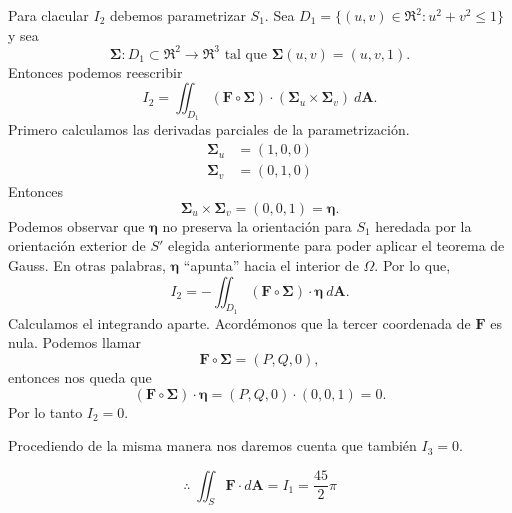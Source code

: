 \begin{solution}
    Para clacular $I_2$  debemos parametrizar $S_1$.  Sea  $D_1=\{(u,v)\in\Re^2:u^2+v^2\leq1\}$ y  sea  $$\boldsymbol{\Sigma}:D_1\subset\Re^2\to\Re^3  \mbox{ tal que }   \boldsymbol{\Sigma}(u,v)=(u,v,1).$$ 
    Entonces podemos reescribir
    \[
    I_2=\iint _{D_1} (\mathbf{F}\circ\boldsymbol{\Sigma})\cdot
    (\boldsymbol{\Sigma}_u\times\boldsymbol{\Sigma}_v)\:d\mathbf{A}.
    \]
    Primero calculamos las derivadas parciales de la parametrizaci\'on.
    \begin{align*}
    \boldsymbol{\Sigma}_u&=(1,0,0)\\
    \boldsymbol{\Sigma}_v&=(0,1,0)
    \end{align*}
    Entonces
    \[
    \boldsymbol{\Sigma}_u\times\boldsymbol{\Sigma}_v=(0,0,1)=\boldsymbol{\eta}.
    \]
    Podemos observar que $\boldsymbol{\eta}$ no preserva la orientaci\'on  para $S_1$ heredada  por la orientaci\'on exterior de $S'$ elegida anteriormente para poder aplicar el teorema de Gauss. En otras palabras,  $\boldsymbol{\eta}$ ``apunta''  hacia el interior de $\Omega$.  Por lo que,
    \[
    I_2=-\iint _{D_1} (\mathbf{F}\circ\boldsymbol{\Sigma})\cdot \boldsymbol{\eta}\:d\mathbf{A}.
    \]
    Calculamos el integrando aparte. Acord\'emonos que la tercer coordenada de $\mathbf{F}$ es nula. Podemos llamar
    \[
    \mathbf{F}\circ\boldsymbol{\Sigma}=(P,Q,0),
    \]
    entonces nos queda que
    \[
    (\mathbf{F}\circ\boldsymbol{\Sigma})\cdot \boldsymbol{\eta}=(P,Q,0)\cdot (0,0,1)=0.
    \]
    Por lo tanto $I_2=0$.
    
    Procediendo de la misma manera nos daremos cuenta que tambi\'en $I_3=0$.

    $$\therefore\;\iint _{S} \mathbf{F}\cdot d\mathbf{A}=I_1=\frac{45}{2}\pi$$
\end{solution}


